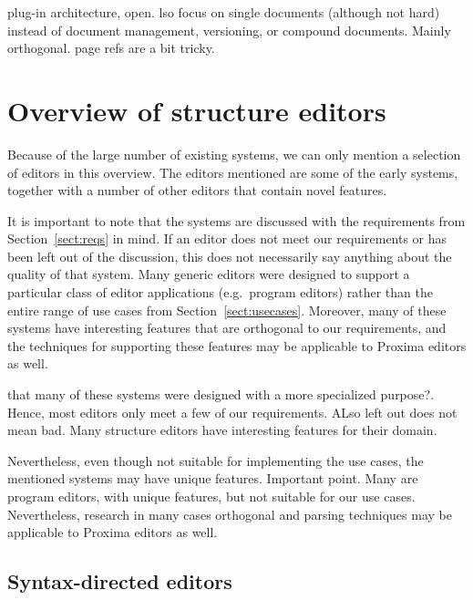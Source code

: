 \documentclass{entcs}
\begin{document}
plug-in architecture, open.
lso focus on single documents (although not hard) 
instead of document management, versioning, or compound documents. Mainly orthogonal.
page refs are a bit tricky.
\ec







%																
%																
%																
\section{Overview of structure editors} \label{sect:editorOverview}

Because of the large number of existing systems, we can only mention a selection of editors in this overview. The editors mentioned are some of the early systems, together with a number of other editors that contain novel features.


It is important to note that the systems are discussed with the requirements from Section~\ref{sect:reqs} in mind. If an editor does not meet our requirements or has been left out of the discussion, this does not necessarily say anything about the quality of that system. Many generic editors were designed to support  a particular class of editor applications (e.g.\ program editors) rather than the entire range of use cases from Section~\ref{sect:usecases}. Moreover, many of these systems have interesting features that are orthogonal to our requirements, and the techniques for supporting these features may be applicable to Proxima editors as well.


\bc
that many of these systems were designed with a more specialized purpose?. Hence, most editors only meet a few of our requirements. ALso left out does not mean bad. Many structure editors have interesting features for their domain. 

Nevertheless, even though not suitable for implementing the use cases, the mentioned systems may have unique features.  
Important point.
Many are program editors, with unique features, but not suitable for our use cases. Nevertheless, research in many cases orthogonal and parsing techniques may be applicable to Proxima editors as well.
\fromHere
\ec

%																
\subsection{Syntax-directed editors} \label{sect:synDirEditors}
\end{document}
